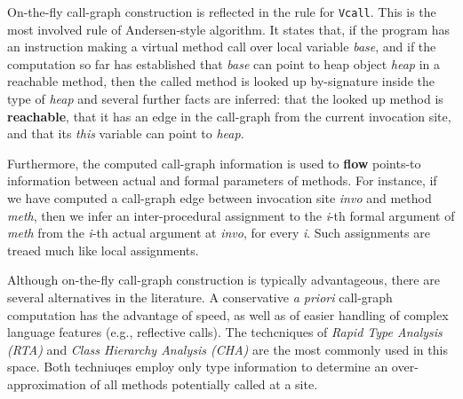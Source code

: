 \begin{itemize}
  On-the-fly call-graph construction is reflected in the rule for
  \texttt{Vcall}. This is the most involved rule of Andersen-style
  algorithm. It states that, if the program has an instruction making
  a virtual method call over local variable \textit{base}, and if the
  computation so far has established that \textit{base} can point to
  heap object \textit{heap} in a reachable method, then the called
  method is looked up by-signature inside the type of \textit{heap}
  and several further facts are inferred: that the looked up method is
  \textbf{reachable}, that it has an edge in the call-graph from the
  current invocation site, and that its \textit{this} variable can
  point to \textit{heap}.

  Furthermore, the computed call-graph information is used to
  \textbf{flow} points-to information between actual and formal
  parameters of methods. For instance, if we have computed a
  call-graph edge between invocation site \textit{invo} and method
  \textit{meth}, then we infer an inter-procedural assignment to the
  \textit{i}-th formal argument of \textit{meth} from the
  \textit{i}-th actual argument at \textit{invo}, for every
  \textit{i}. Such assignments are treaed much like local assignments.

  Although on-the-fly call-graph construction is typically
  advantageous, there are several alternatives in the literature. A
  conservative \textit{a priori} call-graph computation has the
  advantage of speed, as well as of easier handling of complex
  language features (e.g., reflective calls). The techcniques of
  \textit{Rapid Type Analysis (RTA)} and \textit{Class Hierarchy
    Analysis (CHA)} are the most commonly used in this space. Both
  techniuqes employ only type information to determine an
  over-approximation of all methods potentially called at a site.
\end{itemize}


